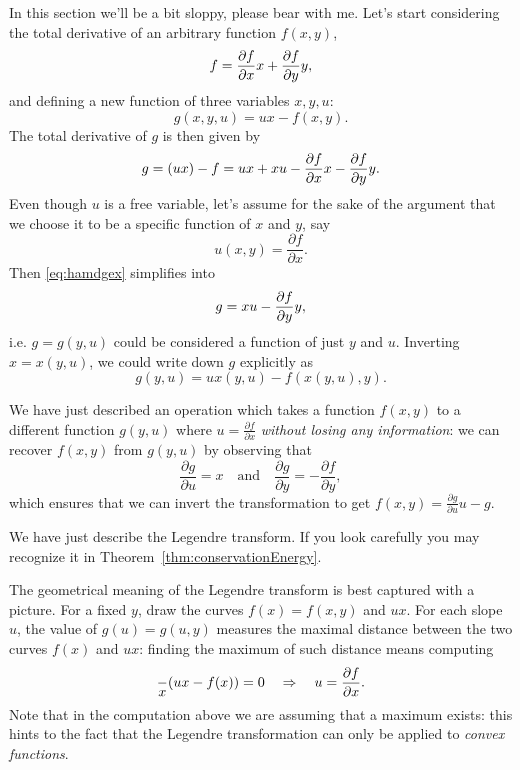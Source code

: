 \documentclass[english,fontsize=11pt,paper=a5,oneside]{scrbook}
\let\d\relax
\DeclareMathOperator{\d}{d}
\theoremstyle{definition}
\begin{document}
In this section we'll be a bit sloppy, please bear with me. 
%
Let's start considering the total derivative of an arbitrary function $f(x,y)$,
\begin{equation}
    \d f = \frac{\partial f}{\partial x} \d x + \frac{\partial f}{\partial y} \d y,
\end{equation}
and defining a new function of three variables $x,y,u$:
\begin{equation}
    g(x,y,u) = ux - f(x,y).
\end{equation}
The total derivative of $g$ is then given by
\begin{equation}\label{eq:hamdgex}
    \d g = \d(ux) - \d f = u\d x + x \d u - \frac{\partial f}{\partial x} \d x - \frac{\partial f}{\partial y} \d y.
\end{equation}
Even though $u$ is a free variable, let's assume for the sake of the argument that we choose it to be a specific function of $x$  and $y$, say
\begin{equation}
    u(x,y) = \frac{\partial f}{\partial x}.
\end{equation}
Then \eqref{eq:hamdgex} simplifies into
\begin{equation}
    \d g = x \d u - \frac{\partial f}{\partial y} \d y,
\end{equation}
i.e. $g=g(y,u)$ could be considered a function of just $y$ and $u$.
Inverting $x = x(y,u)$, we could write down $g$ explicitly as
\begin{equation}
    g(y,u) = u x(y,u) - f(x(y, u), y).
\end{equation}

We have just described an operation which takes a function $f(x,y)$ to a different function $g(y,u)$ where $u = \frac{\partial f}{\partial x}$ \emph{without losing any information}: we can recover $f(x,y)$ from $g(y,u)$ by observing that
\begin{equation}
    \frac{\partial g}{\partial u} = x
    \quad\mbox{and}\quad
    \frac{\partial g}{\partial y} = - \frac{\partial f}{\partial y},
\end{equation}
which ensures that we can invert the transformation to get $f(x,y) = \frac{\partial g}{\partial u}u - g$.

We have just describe the Legendre transform.
If you look carefully you may recognize it in Theorem~\ref{thm:conservationEnergy}.

The geometrical meaning of the Legendre transform is best captured with a picture.
For a fixed $y$, draw the curves $f(x) = f(x,y)$ and $ux$. 
For each slope $u$, the value of $g(u) = g(u,y)$ measures the maximal distance between the two curves $f(x)$ and $ux$: finding the maximum of such distance means
computing
\begin{equation}
    \frac{\d}{\d x}(ux - f(x)) = 0 \quad\Rightarrow\quad u = \frac{\partial f}{\partial x}.
\end{equation}
Note that in the computation above we are assuming that a maximum exists:
this hints to the fact that the Legendre transformation can only be applied to \emph{convex functions}.
\end{document}

